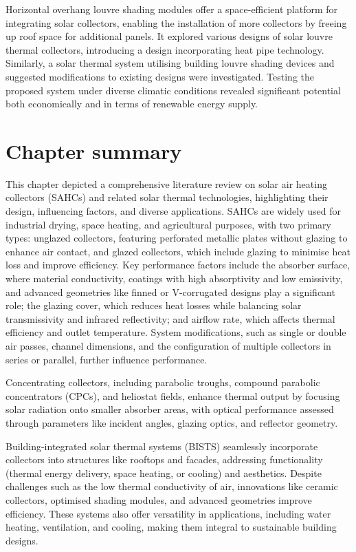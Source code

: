 Horizontal overhang louvre shading modules offer a space-efficient platform for integrating solar collectors, enabling the installation of more collectors by freeing up roof space for additional panels. It explored various designs of solar louvre thermal collectors, introducing a design incorporating heat pipe technology. Similarly, a solar thermal system utilising building louvre shading devices and suggested modifications to existing designs were investigated. Testing the proposed system under diverse climatic conditions revealed significant potential both economically and in terms of renewable energy supply.

\section{Chapter summary}

This chapter depicted a comprehensive literature review on solar air heating collectors (SAHCs) and related solar thermal technologies, highlighting their design, influencing factors, and diverse applications. SAHCs are widely used for industrial drying, space heating, and agricultural purposes, with two primary types: unglazed collectors, featuring perforated metallic plates without glazing to enhance air contact, and glazed collectors, which include glazing to minimise heat loss and improve efficiency. Key performance factors include the absorber surface, where material conductivity, coatings with high absorptivity and low emissivity, and advanced geometries like finned or V-corrugated designs play a significant role; the glazing cover, which reduces heat losses while balancing solar transmissivity and infrared reflectivity; and airflow rate, which affects thermal efficiency and outlet temperature. System modifications, such as single or double air passes, channel dimensions, and the configuration of multiple collectors in series or parallel, further influence performance. 

Concentrating collectors, including parabolic troughs, compound parabolic concentrators (CPCs), and heliostat fields, enhance thermal output by focusing solar radiation onto smaller absorber areas, with optical performance assessed through parameters like incident angles, glazing optics, and reflector geometry. 

Building-integrated solar thermal systems (BISTS) seamlessly incorporate collectors into structures like rooftops and facades, addressing functionality (thermal energy delivery, space heating, or cooling) and aesthetics. Despite challenges such as the low thermal conductivity of air, innovations like ceramic collectors, optimised shading modules, and advanced geometries improve efficiency. These systems also offer versatility in applications, including water heating, ventilation, and cooling, making them integral to sustainable building designs.






